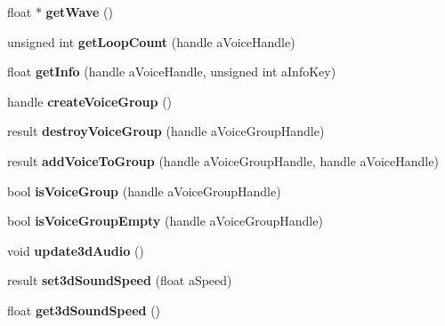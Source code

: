 \begin{DoxyCompactItemize}
float $\ast$ {\bfseries get\+Wave} ()
\item 
\mbox{\label{class_so_loud_1_1_soloud_a52f6f46f7ae7336142b513ae9fb85d8a}} 
unsigned int {\bfseries get\+Loop\+Count} (handle a\+Voice\+Handle)
\item 
\mbox{\label{class_so_loud_1_1_soloud_a6d3e22a24f49a86edce0ad542d9656bb}} 
float {\bfseries get\+Info} (handle a\+Voice\+Handle, unsigned int a\+Info\+Key)
\item 
\mbox{\label{class_so_loud_1_1_soloud_aeb0fd120e6e0239c9e718fb8789ddffe}} 
handle {\bfseries create\+Voice\+Group} ()
\item 
\mbox{\label{class_so_loud_1_1_soloud_aae50bbfa2f6bd1e598ef6b5b15636e9c}} 
result {\bfseries destroy\+Voice\+Group} (handle a\+Voice\+Group\+Handle)
\item 
\mbox{\label{class_so_loud_1_1_soloud_a9db61d9832918e34b27fc8f07e03181a}} 
result {\bfseries add\+Voice\+To\+Group} (handle a\+Voice\+Group\+Handle, handle a\+Voice\+Handle)
\item 
\mbox{\label{class_so_loud_1_1_soloud_a7e0cce56db2108f4401244a7f7b4b209}} 
bool {\bfseries is\+Voice\+Group} (handle a\+Voice\+Group\+Handle)
\item 
\mbox{\label{class_so_loud_1_1_soloud_af7805b0b20fc49629a9e45eda96ae445}} 
bool {\bfseries is\+Voice\+Group\+Empty} (handle a\+Voice\+Group\+Handle)
\item 
\mbox{\label{class_so_loud_1_1_soloud_a21eb58ebde3955245ac69e3aa5b5f145}} 
void {\bfseries update3d\+Audio} ()
\item 
\mbox{\label{class_so_loud_1_1_soloud_a0e819643ca149ca31718322cdde5bf00}} 
result {\bfseries set3d\+Sound\+Speed} (float a\+Speed)
\item 
\mbox{\label{class_so_loud_1_1_soloud_a49769664474746f5eada52300e46f2b8}} 
float {\bfseries get3d\+Sound\+Speed} ()

\end{DoxyCompactItemize}
